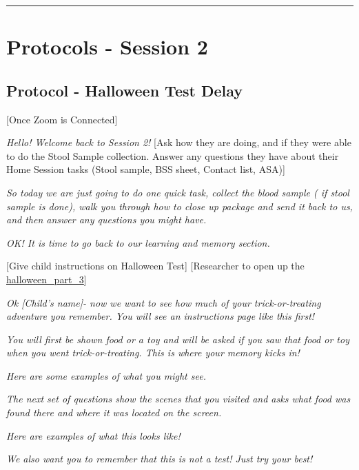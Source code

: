 \documentclass[]{book}
\begin{document}
\begin{center}\rule{0.5\linewidth}{0.5pt}\end{center}

\hypertarget{protocols---session-2-1}{%
\section{Protocols - Session 2}\label{protocols---session-2-1}}

\hypertarget{protocol---halloween-test-delay-1}{%
\subsection{Protocol - Halloween Test Delay}\label{protocol---halloween-test-delay-1}}

{[}Once Zoom is Connected{]}

\emph{Hello! Welcome back to Session 2!} {[}Ask how they are doing, and if they were able to do the Stool Sample collection. Answer any questions they have about their Home Session tasks (Stool sample, BSS sheet, Contact list, ASA){]}

\emph{So today we are just going to do one quick task, collect the blood sample ( if stool sample is done), walk you through how to close up package and send it back to us, and then answer any questions you might have.}

\emph{OK! It is time to go back to our learning and memory section.}

{[}Give child instructions on Halloween Test{]} {[}Researcher to open up the \href{https://ucla.app.box.com/file/737558206552}{halloween\_part\_3}{]}

\emph{Ok {[}Child's name{]}- now we want to see how much of your trick-or-treating adventure you remember. You will see an instructions page like this first!}

\emph{You will first be shown food or a toy and will be asked if you saw that food or toy when you went trick-or-treating. This is where your memory kicks in!}

\emph{Here are some examples of what you might see.}

\emph{The next set of questions show the scenes that you visited and asks what food was found there and where it was located on the screen.}

\emph{Here are examples of what this looks like!}

\emph{We also want you to remember that this is not a test! Just try your best!}
\end{document}

